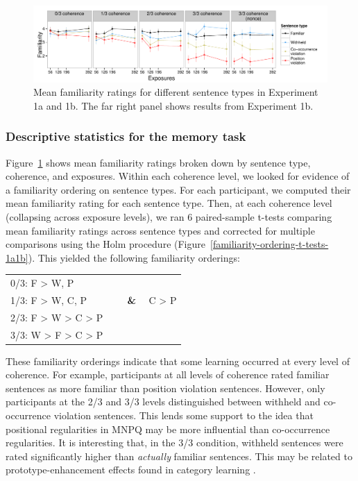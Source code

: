 \documentclass[man,floatsintext]{apa6}
\begin{document}
\begin{figure}[t]
  \begin{center}
    \includegraphics[width=1.0\linewidth]{x1-descriptive-memory}
    \caption{Mean familiarity ratings for different sentence types in Experiment 1a and 1b. The far right panel shows results from Experiment 1b.}
    \label{x1-descriptive-mem}
  \end{center}
\end{figure}

\subsubsection{Descriptive statistics for the memory task}

Figure~\ref{x1-descriptive-mem} shows mean familiarity ratings broken down by sentence type, coherence, and exposures. Within each coherence level, we looked for evidence of a familiarity ordering on sentence types. For each participant, we computed their mean familiarity rating for each sentence type. Then, at each coherence level (collapsing across exposure levels), we ran 6 paired-sample t-tests comparing mean familiarity ratings across sentence types and corrected for multiple comparisons using the Holm procedure (Figure~\ref{familiarity-ordering-t-tests-1a1b}). This yielded the following familiarity orderings:
\begin{center}
  \begin{tabular}{l l }
    0/3: F > W, P & \\
    1/3: F > W, C, P & \, \, \, \textbf{\&} \, \, C > P\\
    2/3: F > W > C > P & \\
    3/3: W > F > C > P & \\
  \end{tabular}
\end{center}
\noindent These familiarity orderings indicate that some learning occurred at every level of coherence. For example, participants at all levels of coherence rated familiar sentences as more familiar than position violation sentences. However, only participants at the 2/3 and 3/3 levels distinguished between withheld and co-occurrence violation sentences. This lends some support to the idea that positional regularities in MNPQ may be more influential than co-occurrence regularities. It is interesting that, in the 3/3 condition, withheld sentences were rated significantly higher than \emph{actually} familiar sentences. This may be related to prototype-enhancement effects found in category learning \citep[e.g.,][]{smith2002}.
\end{document}
